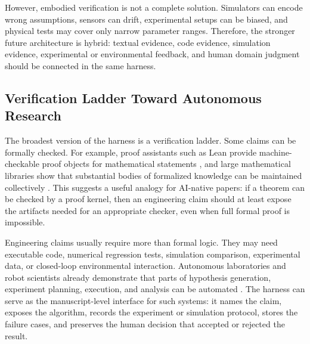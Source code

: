 \documentclass{article}
\begin{document}
However, embodied verification is not a complete solution. Simulators can encode wrong assumptions, sensors can drift, experimental setups can be biased, and physical tests may cover only narrow parameter ranges. Therefore, the stronger future architecture is hybrid: textual evidence, code evidence, simulation evidence, experimental or environmental feedback, and human domain judgment should be connected in the same harness.

\subsection{Verification Ladder Toward Autonomous Research}

The broadest version of the harness is a verification ladder. Some claims can be formally checked. For example, proof assistants such as Lean provide machine-checkable proof objects for mathematical statements \citep{deMoura2015lean}, and large mathematical libraries show that substantial bodies of formalized knowledge can be maintained collectively \citep{mathlib2020}. This suggests a useful analogy for AI-native papers: if a theorem can be checked by a proof kernel, then an engineering claim should at least expose the artifacts needed for an appropriate checker, even when full formal proof is impossible.

Engineering claims usually require more than formal logic. They may need executable code, numerical regression tests, simulation comparison, experimental data, or closed-loop environmental interaction. Autonomous laboratories and robot scientists already demonstrate that parts of hypothesis generation, experiment planning, execution, and analysis can be automated \citep{king2004robot,macleod2020selfdriving,gongora2020autonomous}. The harness can serve as the manuscript-level interface for such systems: it names the claim, exposes the algorithm, records the experiment or simulation protocol, stores the failure cases, and preserves the human decision that accepted or rejected the result.
\end{document}

